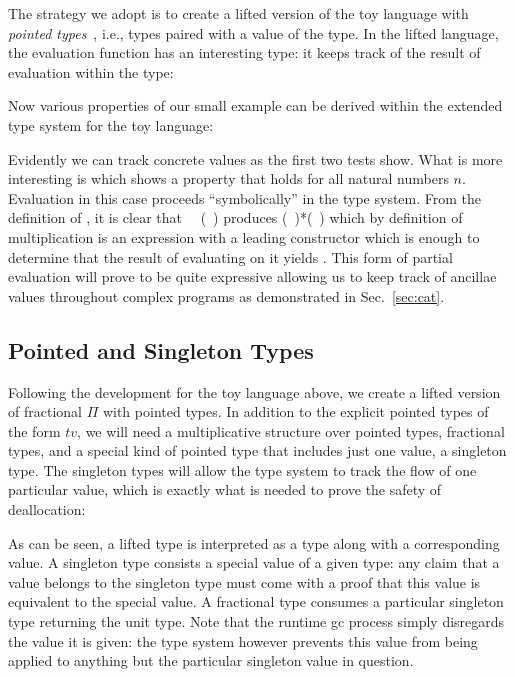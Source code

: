 \documentclass[sigplan,10pt,review,anonymous]{acmart}
\newcommand{\Afun}[1]{\AgdaFunction{#1}}
\newcommand{\Acon}[1]{\AgdaInductiveConstructor{#1}}
\newcommand{\Avar}[1]{\AgdaBound{#1}}
\begin{document}
The strategy we adopt is to create a lifted version of the toy
language with \emph{pointed types}~\cite{hottbook}, i.e., types paired with
a value of the type. In the lifted language, the evaluation
function has an interesting type: it keeps track of the result of
evaluation within the type:

\Jexamplecont{}

Now various properties of our small example
 can be derived within
the extended type system for the toy language:

\Jexampletest{}

Evidently we can track concrete values as the first two tests
show. What is more interesting is  which shows a
property that holds for all natural numbers $n$. Evaluation in this
case proceeds ``symbolically'' in the type system. From the definition
of \Afun{eval}, it is clear that
\Afun{eval}~\Acon{square}~(\Acon{suc}~\Avar{n}) produces
(\Acon{suc}~\Avar{n})*(\Acon{suc}~\Avar{n}) which by definition of
multiplication is an expression with a leading \Acon{suc} constructor
which is enough to determine that the result of evaluating
\Acon{isZero} on it yields \Acon{false}. This form of partial
evaluation will prove to be quite expressive allowing us to keep track
of ancillae values throughout complex programs as demonstrated in
Sec.~\ref{sec:cat}.

\subsection{Pointed and Singleton Types}

Following the development for the toy language above, we create a
lifted version of fractional $\Pi$ with pointed types. In addition to
the explicit pointed types of the form $t$\Acon{\#}$v$, we will need a
multiplicative structure over pointed types, fractional types, and a
special kind of pointed type that includes just one value, a singleton
type. The singleton types will allow the type system to track the flow
of one particular value, which is exactly what is needed to prove the
safety of deallocation:

\PIPFUdef{}

As can be seen, a lifted type is interpreted as a type along with a
corresponding value. A singleton type consists a special value of a
given type: any claim that a value belongs to the singleton type must
come with a proof that this value is equivalent to the special
value. A fractional type consumes a particular singleton type
returning the unit type. Note that the runtime gc process simply
disregards the value it is given: the type system however prevents
this value from being applied to anything but the particular singleton
value in question.
\end{document}
